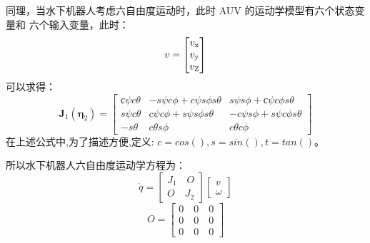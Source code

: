 同理，当水下机器人考虑六自由度运动时，此时 AUV 的运动学模型有六个状态变量和
六个输入变量，此时：
\begin{equation}
    \\v=
    \begin{bmatrix}v_\mathrm{x}\\v_\mathrm{y}\\v_\mathrm{Z}\end{bmatrix}
\end{equation}
可以求得：
\begin{equation}
    \left.\boldsymbol{J}_1(\boldsymbol{\eta}_2)=\left[\begin{array}{ccc}\text{с}\psi c\theta&-s\psi c\phi+c\psi s\phi s\theta&s\psi s\phi+\text{с}\psi c\phi s\theta\\s\psi c\theta&c\psi c\phi+s\psi s\phi s\theta&-c\psi s\phi+s\psi c\phi s\theta\\-s\theta&c\theta s\phi&c\theta c\phi\end{array}\right.\right]
\end{equation}
在上述公式中,为了描述方便,定义:
 $ c = cos() , s = sin(), t = tan()$。

 所以水下机器人六自由度运动学方程为：
 \begin{equation}
     \dot{q}=\begin{bmatrix}J_1\quad O\\ O\quad J_2\end{bmatrix}\begin{bmatrix}v\\\omega\end{bmatrix}
 \end{equation}
 \begin{equation}
    O=\begin{bmatrix}0\quad 0\quad 0\\0\quad 0\quad 0\\0\quad 0\quad 0\end{bmatrix}
\end{equation}
